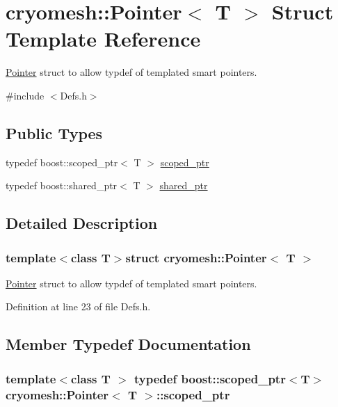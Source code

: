 \hypertarget{structcryomesh_1_1Pointer}{\section{cryomesh\-:\-:\-Pointer$<$ \-T $>$ \-Struct \-Template \-Reference}
\label{structcryomesh_1_1Pointer}
}


\hyperlink{structcryomesh_1_1Pointer}{\-Pointer} struct to allow typdef of templated smart pointers.  




{\ttfamily \#include $<$\-Defs.\-h$>$}

\subsection*{\-Public \-Types}
\begin{DoxyCompactItemize}
\item 
typedef boost\-::scoped\-\_\-ptr$<$ \-T $>$ \hyperlink{structcryomesh_1_1Pointer_a84794c15bea7c7dd8fceb679054cbdf8}{scoped\-\_\-ptr}
\item 
typedef boost\-::shared\-\_\-ptr$<$ \-T $>$ \hyperlink{structcryomesh_1_1Pointer_a825e9aaef4547bc1dd4c19424c162b89}{shared\-\_\-ptr}
\end{DoxyCompactItemize}


\subsection{\-Detailed \-Description}
\subsubsection*{template$<$class T$>$struct cryomesh\-::\-Pointer$<$ T $>$}

\hyperlink{structcryomesh_1_1Pointer}{\-Pointer} struct to allow typdef of templated smart pointers. 

\-Definition at line 23 of file \-Defs.\-h.



\subsection{\-Member \-Typedef \-Documentation}
\hypertarget{structcryomesh_1_1Pointer_a84794c15bea7c7dd8fceb679054cbdf8}{
\subsubsection[{scoped\-\_\-ptr}]{\setlength{\rightskip}{0pt plus 5cm}template$<$class T $>$ typedef boost\-::scoped\-\_\-ptr$<$\-T$>$ {\bf cryomesh\-::\-Pointer}$<$ \-T $>$\-::{\bf scoped\-\_\-ptr}}}\label{structcryomesh_1_1Pointer_a84794c15bea7c7dd8fceb679054cbdf8}


